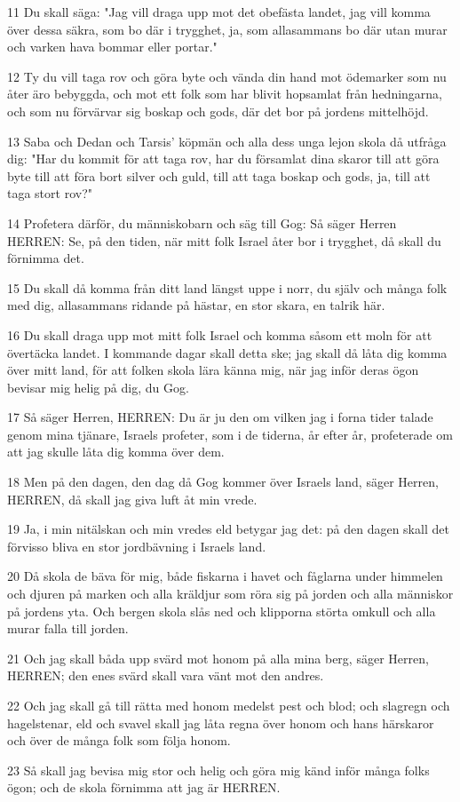 \par 11 Du skall säga: "Jag vill draga upp mot det obefästa landet, jag vill komma över dessa säkra, som bo där i trygghet, ja, som allasammans bo där utan murar och varken hava bommar eller portar."
\par 12 Ty du vill taga rov och göra byte och vända din hand mot ödemarker som nu åter äro bebyggda, och mot ett folk som har blivit hopsamlat från hedningarna, och som nu förvärvar sig boskap och gods, där det bor på jordens mittelhöjd.
\par 13 Saba och Dedan och Tarsis' köpmän och alla dess unga lejon skola då utfråga dig: "Har du kommit för att taga rov, har du församlat dina skaror till att göra byte till att föra bort silver och guld, till att taga boskap och gods, ja, till att taga stort rov?"
\par 14 Profetera därför, du människobarn och säg till Gog: Så säger Herren HERREN: Se, på den tiden, när mitt folk Israel åter bor i trygghet, då skall du förnimma det.
\par 15 Du skall då komma från ditt land längst uppe i norr, du själv och många folk med dig, allasammans ridande på hästar, en stor skara, en talrik här.
\par 16 Du skall draga upp mot mitt folk Israel och komma såsom ett moln för att övertäcka landet. I kommande dagar skall detta ske; jag skall då låta dig komma över mitt land, för att folken skola lära känna mig, när jag inför deras ögon bevisar mig helig på dig, du Gog.
\par 17 Så säger Herren, HERREN: Du är ju den om vilken jag i forna tider talade genom mina tjänare, Israels profeter, som i de tiderna, år efter år, profeterade om att jag skulle låta dig komma över dem.
\par 18 Men på den dagen, den dag då Gog kommer över Israels land, säger Herren, HERREN, då skall jag giva luft åt min vrede.
\par 19 Ja, i min nitälskan och min vredes eld betygar jag det: på den dagen skall det förvisso bliva en stor jordbävning i Israels land.
\par 20 Då skola de bäva för mig, både fiskarna i havet och fåglarna under himmelen och djuren på marken och alla kräldjur som röra sig på jorden och alla människor på jordens yta. Och bergen skola slås ned och klipporna störta omkull och alla murar falla till jorden.
\par 21 Och jag skall båda upp svärd mot honom på alla mina berg, säger Herren, HERREN; den enes svärd skall vara vänt mot den andres.
\par 22 Och jag skall gå till rätta med honom medelst pest och blod; och slagregn och hagelstenar, eld och svavel skall jag låta regna över honom och hans härskaror och över de många folk som följa honom.
\par 23 Så skall jag bevisa mig stor och helig och göra mig känd inför många folks ögon; och de skola förnimma att jag är HERREN.

